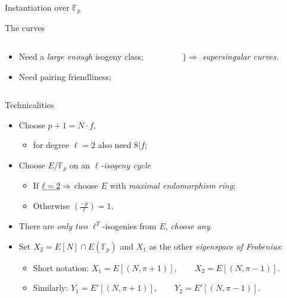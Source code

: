 \documentclass[aspectratio=169]{beamer}
\newcommand{\F}{\mathbb{F}}
\begin{document}

\begin{frame}{Instantiation over $\F_p$}
  \begin{block}{The curves}
    \begin{columns}
      \begin{column}{0.5\textwidth}
        \begin{itemize}
        \item Need a \textit{large enough} isogeny class;
        \item Need pairing friendliness;
        \end{itemize}
      \end{column}
      \begin{column}{0.6\textwidth}
        $\Biggr\}\Rightarrow$ \emph{supersingular curves}.
      \end{column}
    \end{columns}
  \end{block}

  \begin{block}{Technicalities}
    \begin{itemize}
    \item<2-> Choose \emph{$p+1 = N\cdot f$},
      \begin{itemize}
      \item for degree $\ell=2$ also need $8|f$;
      \end{itemize}
    \item<3-> Choose \emph{$E/\F_p$} on an \emph{$\ell$-isogeny cycle}
      \begin{itemize}
      \item If $\emph{\ell=2} \Rightarrow$ choose $E$ with
        \emph{maximal endomorphism ring};
      \item Otherwise \emph{$\left(\frac{-p}{\ell}\right)=1$}.
      \end{itemize}
    \item<4-> There are \emph{only two} $\ell^T$-isogenies from $E$,
      \emph{choose any}.
    \item<5-> Set \emph{$X_2=E[N]\cap E(\F_p)$} and \emph{$X_1$} as the other
      \emph{eigenspace of Frobenius}:
      \begin{itemize}
      \item Short notation:
        \hfill\emph{$X_1=E[(N,\pi+1)],\qquad X_2=E[(N,\pi-1)].$}\hspace{10em}\strut
      \item Similarly:
        \hfill\emph{$Y_1=E'[(N,\pi+1)],\qquad Y_2=E'[(N,\pi-1)].$}\hspace{10em}\strut
      \end{itemize}
    \end{itemize}
  \end{block}
\end{frame}
\end{document}
